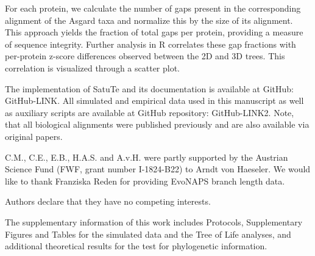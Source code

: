 For each protein, we calculate the number of gaps present in the corresponding alignment of the Asgard taxa and normalize this by the size of its alignment. This approach yields the fraction of total gaps per protein, providing a measure of sequence integrity. Further analysis in R correlates these gap fractions with per-protein z-score differences observed between the 2D and 3D trees. This correlation is visualized through a scatter plot.

\bigskip

 The implementation of SatuTe and its documentation is available at GitHub: GitHub-LINK.  All simulated and empirical data used in this manuscript as well as auxiliary scripts are available at GitHub repository: GitHub-LINK2. Note, that all biological alignments were published previously and are also available via original papers.







 C.M., C.E., E.B., H.A.S. and A.v.H. were partly supported by the Austrian Science Fund (FWF, grant number I-1824-B22) to Arndt von Haeseler. We would like to thank Franziska Reden for providing EvoNAPS branch length data.


Authors declare that they have no competing interests.



The supplementary information of this work
includes  Protocols, Supplementary Figures and Tables for the simulated data and the Tree of Life analyses, and additional theoretical results for the test for phylogenetic information.


\resetsections 